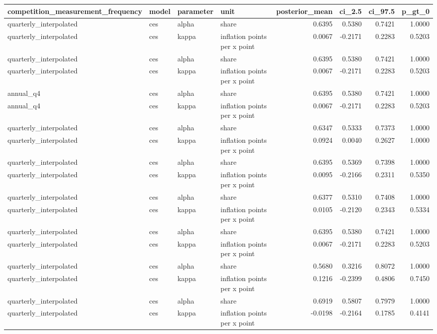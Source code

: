 \begin{tabular}{llllrrrr}
\toprule
competition\_measurement\_frequency & model & parameter & unit & posterior\_mean & ci\_2.5 & ci\_97.5 & p\_gt\_0 \\
\midrule
quarterly\_interpolated & ces & alpha & share & 0.6395 & 0.5380 & 0.7421 & 1.0000 \\
quarterly\_interpolated & ces & kappa & inflation points per x point & 0.0067 & -0.2171 & 0.2283 & 0.5203 \\
quarterly\_interpolated & ces & alpha & share & 0.6395 & 0.5380 & 0.7421 & 1.0000 \\
quarterly\_interpolated & ces & kappa & inflation points per x point & 0.0067 & -0.2171 & 0.2283 & 0.5203 \\
annual\_q4 & ces & alpha & share & 0.6395 & 0.5380 & 0.7421 & 1.0000 \\
annual\_q4 & ces & kappa & inflation points per x point & 0.0067 & -0.2171 & 0.2283 & 0.5203 \\
quarterly\_interpolated & ces & alpha & share & 0.6347 & 0.5333 & 0.7373 & 1.0000 \\
quarterly\_interpolated & ces & kappa & inflation points per x point & 0.0924 & 0.0040 & 0.2627 & 1.0000 \\
quarterly\_interpolated & ces & alpha & share & 0.6395 & 0.5369 & 0.7398 & 1.0000 \\
quarterly\_interpolated & ces & kappa & inflation points per x point & 0.0095 & -0.2166 & 0.2311 & 0.5350 \\
quarterly\_interpolated & ces & alpha & share & 0.6377 & 0.5310 & 0.7408 & 1.0000 \\
quarterly\_interpolated & ces & kappa & inflation points per x point & 0.0105 & -0.2120 & 0.2343 & 0.5334 \\
quarterly\_interpolated & ces & alpha & share & 0.6395 & 0.5380 & 0.7421 & 1.0000 \\
quarterly\_interpolated & ces & kappa & inflation points per x point & 0.0067 & -0.2171 & 0.2283 & 0.5203 \\
quarterly\_interpolated & ces & alpha & share & 0.5680 & 0.3216 & 0.8072 & 1.0000 \\
quarterly\_interpolated & ces & kappa & inflation points per x point & 0.1216 & -0.2399 & 0.4806 & 0.7450 \\
quarterly\_interpolated & ces & alpha & share & 0.6919 & 0.5807 & 0.7979 & 1.0000 \\
quarterly\_interpolated & ces & kappa & inflation points per x point & -0.0198 & -0.2164 & 0.1785 & 0.4141 \\

\end{tabular}
